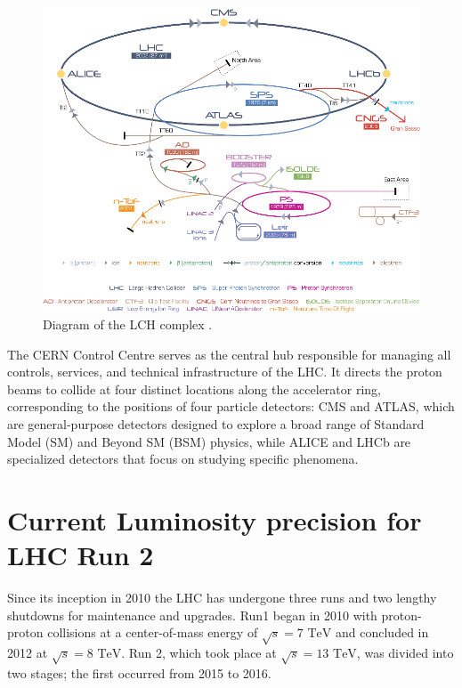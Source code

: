 \begin{center}
  \begin{figure}[h]
    \centering
    \includegraphics[scale=.45]{Chapter1/lhc_complex_fig.png}
    \caption[LHC Complex]{Diagram of the LCH complex \cite{lhc_complex}.}
    \label{lhc_com}
  \end{figure}
\end{center}

The CERN Control Centre serves as the central hub responsible for managing all controls, services, and technical infrastructure of the LHC. It directs the proton beams to collide at four distinct locations along the accelerator ring, corresponding to the positions of four particle detectors: CMS and ATLAS, which are general-purpose detectors designed to explore a broad range of Standard Model (SM) and Beyond SM (BSM) physics, while ALICE and LHCb are specialized detectors that focus on studying specific phenomena.

\section{Current Luminosity precision for LHC Run 2}

Since its inception in 2010 the LHC has undergone three runs and two lengthy shutdowns for maintenance and upgrades. 
Run1 began in 2010 with proton-proton collisions at a center-of-mass energy of $\sqrt{s}=\text{7 TeV}$ and concluded in 2012 at  $\sqrt{s}=\text{8 TeV}$. Run 2, which took place at $\sqrt{s}=\text{13 TeV}$, was divided into two stages; the first  occurred from 2015 to 2016.\\

